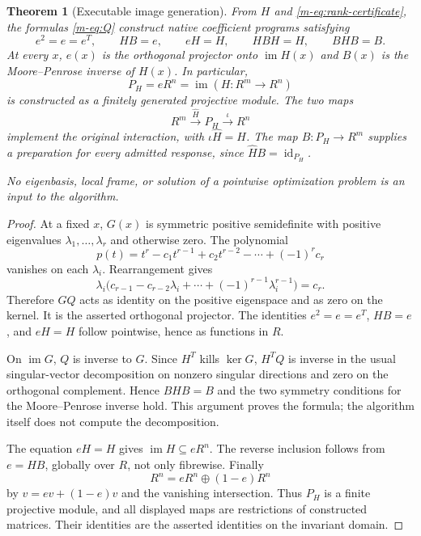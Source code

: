 \documentclass[11pt]{article}
\newtheorem{theorem}{Theorem}[section]
\theoremstyle{definition}
\theoremstyle{remark}
\newcommand{\im}{\operatorname{im}}
\newcommand{\id}{\operatorname{id}}
\begin{document}
\begin{theorem}[Executable image generation]\label{m-thm:image}
From $H$ and \eqref{m-eq:rank-certificate}, the formulas \eqref{m-eq:Q} construct native coefficient programs satisfying
\[
 e^2=e=e^T,\qquad HB=e,\qquad eH=H,\qquad HBH=H,
 \qquad BHB=B.
\]
At every $x$, $e(x)$ is the orthogonal projector onto $\im H(x)$ and $B(x)$ is the Moore--Penrose inverse of $H(x)$. In particular,
\[
 P_H=eR^n=\im(H:R^m\to R^n)
\]
is constructed as a finitely generated projective module. The two maps
\[
 R^m\xrightarrow{\widehat H} P_H\xrightarrow{\iota}R^n
\]
implement the original interaction, with $\iota\widehat H=H$. The map $B:P_H\to R^m$ supplies a preparation for every admitted response, since $\widehat HB=\id_{P_H}$.

No eigenbasis, local frame, or solution of a pointwise optimization problem is an input to the algorithm.
\end{theorem}
\begin{proof}
At a fixed $x$, $G(x)$ is symmetric positive semidefinite with positive eigenvalues $\lambda_1,\ldots,\lambda_r$ and otherwise zero. The polynomial
\[
 p(t)=t^r-c_1t^{r-1}+c_2t^{r-2}-\cdots+(-1)^r c_r
\]
vanishes on each $\lambda_i$. Rearrangement gives
\[
 \lambda_i\big(c_{r-1}-c_{r-2}\lambda_i+\cdots+(-1)^{r-1}\lambda_i^{r-1}\big)=c_r.
\]
Therefore $GQ$ acts as identity on the positive eigenspace and as zero on the kernel. It is the asserted orthogonal projector. The identities $e^2=e=e^T$, $HB=e$, and $eH=H$ follow pointwise, hence as functions in $R$.

On $\im G$, $Q$ is inverse to $G$. Since $H^T$ kills $\ker G$, $H^TQ$ is inverse in the usual singular-vector decomposition on nonzero singular directions and zero on the orthogonal complement. Hence $BHB=B$ and the two symmetry conditions for the Moore--Penrose inverse hold. This argument proves the formula; the algorithm itself does not compute the decomposition.

The equation $eH=H$ gives $\im H\subseteq eR^n$. The reverse inclusion follows from $e=HB$, globally over $R$, not only fibrewise. Finally
\[
 R^n=eR^n\oplus(1-e)R^n
\]
by $v=ev+(1-e)v$ and the vanishing intersection. Thus $P_H$ is a finite projective module, and all displayed maps are restrictions of constructed matrices. Their identities are the asserted identities on the invariant domain.
\end{proof}
\end{document}
